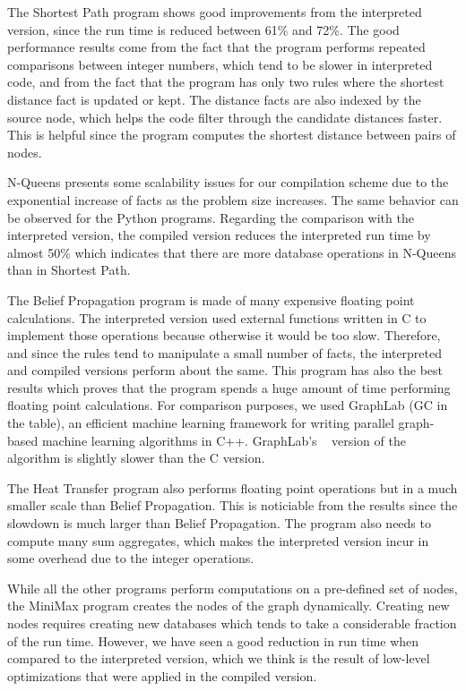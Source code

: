 The Shortest Path program shows good improvements from the interpreted version,
since the run time is reduced between 61\% and 72\%.  The good performance results
come from the fact that the program performs repeated comparisons between
integer numbers, which tend to be slower in interpreted code, and from the fact
that the program has only two rules where the shortest distance fact is updated
or kept.  The distance facts are also indexed by the source node, which helps
the code filter through the candidate distances faster. This is helpful
since the program computes the shortest distance between pairs of nodes.

N-Queens presents some scalability issues for our compilation scheme due to the
exponential increase of facts as the problem size increases.  The same behavior
can be observed for the Python programs. Regarding the comparison with the
interpreted version, the compiled version reduces the interpreted run time by
almost 50\% which indicates that there are more database operations in N-Queens
than in Shortest Path.

The Belief Propagation program is made of many expensive floating point
calculations. The interpreted version used external functions written in C to
implement those operations because otherwise it would be too slow. Therefore,
and since the rules tend to manipulate a small number of facts, the interpreted
and compiled versions perform about the same. This program has also the best
results which proves that the program spends a huge amount of time performing
floating point calculations. For comparison purposes, we used GraphLab (GC in
the table), an efficient machine learning framework for writing parallel
graph-based machine learning algorithms in C++.  GraphLab's ~\cite{GraphLab2010}
version of the algorithm is slightly slower than the C version.

The Heat Transfer program also performs floating point operations but in a much
smaller scale than Belief Propagation. This is noticiable from the results since
the slowdown is much larger than Belief Propagation. The program also needs to
compute many sum aggregates, which makes the interpreted version incur in some
overhead due to the integer operations.

While all the other programs perform computations on a pre-defined set of nodes,
the MiniMax program creates the nodes of the graph dynamically.  Creating new
nodes requires creating new databases which tends to take a considerable
fraction of the run time. However, we have seen a good reduction in run time
when compared to the interpreted version, which we think is the result of
low-level optimizations that were applied in the compiled version.

